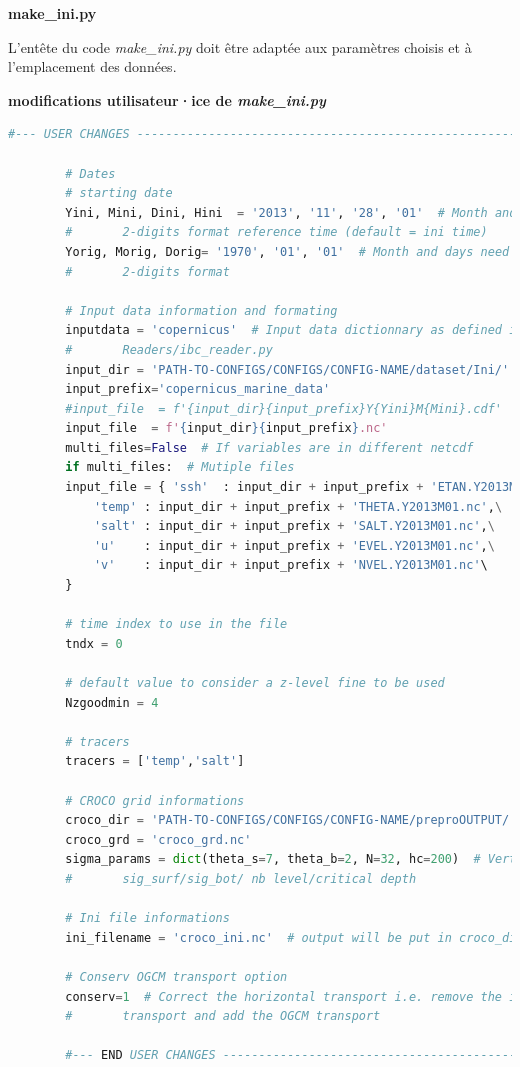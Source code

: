 \documentclass[10pt,a4paper,titlepage]{article}
\begin{document}
\textbf{make\_ini.py}

L'entête du code \textit{make\_ini.py} doit être adaptée aux paramètres choisis et à l'emplacement des données.

\begin{codeEnv}{\textbf{modifications utilisateur·ice de \textit{make\_ini.py}}}
    \begin{lstlisting}[language=python]
        #--- USER CHANGES ---------------------------------------------------------

        # Dates
        # starting date
        Yini, Mini, Dini, Hini  = '2013', '11', '28', '01'  # Month and days need to be
        #       2-digits format reference time (default = ini time)
        Yorig, Morig, Dorig= '1970', '01', '01'  # Month and days need to be
        #       2-digits format

        # Input data information and formating
        inputdata = 'copernicus'  # Input data dictionnary as defined in the
        #       Readers/ibc_reader.py
        input_dir = 'PATH-TO-CONFIGS/CONFIGS/CONFIG-NAME/dataset/Ini/'
        input_prefix='copernicus_marine_data'
        #input_file  = f'{input_dir}{input_prefix}Y{Yini}M{Mini}.cdf'
        input_file  = f'{input_dir}{input_prefix}.nc'
        multi_files=False  # If variables are in different netcdf
        if multi_files:  # Mutiple files
        input_file = { 'ssh'  : input_dir + input_prefix + 'ETAN.Y2013M01.nc',\
            'temp' : input_dir + input_prefix + 'THETA.Y2013M01.nc',\
            'salt' : input_dir + input_prefix + 'SALT.Y2013M01.nc',\
            'u'    : input_dir + input_prefix + 'EVEL.Y2013M01.nc',\
            'v'    : input_dir + input_prefix + 'NVEL.Y2013M01.nc'\
        }

        # time index to use in the file
        tndx = 0

        # default value to consider a z-level fine to be used
        Nzgoodmin = 4

        # tracers
        tracers = ['temp','salt']

        # CROCO grid informations
        croco_dir = 'PATH-TO-CONFIGS/CONFIGS/CONFIG-NAME/preproOUTPUT/'
        croco_grd = 'croco_grd.nc'
        sigma_params = dict(theta_s=7, theta_b=2, N=32, hc=200)  # Vertical streching,
        #       sig_surf/sig_bot/ nb level/critical depth

        # Ini file informations
        ini_filename = 'croco_ini.nc'  # output will be put in croco_dir by default

        # Conserv OGCM transport option
        conserv=1  # Correct the horizontal transport i.e. remove the integrated
        #       transport and add the OGCM transport

        #--- END USER CHANGES -----------------------------------------------------

    \end{lstlisting}
\end{codeEnv}
\end{document}
